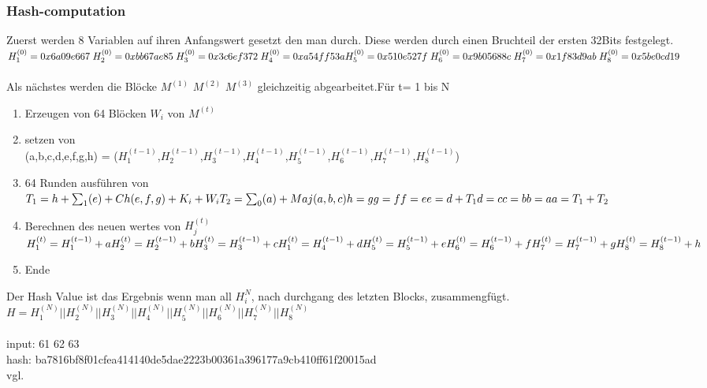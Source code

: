 {\subsubsection{Hash-computation}
\label{sec:hash-computation}
Zuerst werden 8 Variablen auf ihren Anfangswert gesetzt den man durch. Diese werden durch einen Bruchteil der ersten 32Bits festgelegt.\\
$H_1^{(0)} = 0x6a09e667\;  H_2^{(0)} = 0xbb67ae85\;   H_3^{(0)} = 0x3c6ef372 \;  H_4^{(0)} = 0xa54ff53a \\H_5^{(0)} = 0x510e527f\;  H_6^{(0)} = 0x9b05688c\;  H_7^{(0)} = 0x1f83d9ab\;H_8^{(0)} = 0x5be0cd19\;    $\\ \\
Als nächstes werden die Blöcke $M^{(1)}$ $M^{(2)}$ $M^{(3)}$ gleichzeitig abgearbeitet.Für t= 1 bis N
\begin{enumerate}
\item Erzeugen von 64 Blöcken $W_i$ von $M^{(t)}$
\item setzen von \\(a,b,c,d,e,f,g,h) = ($H_1^{(t-1)}$,$H_2^{(t-1)}$,$H_3^{(t-1)}$,$H_4^{(t-1)}$,$H_5^{(t-1)}$,$H_6^{(t-1)}$,$H_7^{(t-1)}$,$H_8^{(t-1)}$)
\item 64 Runden ausführen von\\$T_1 = h + {\sum_1} (e) + Ch(e, f, g) + K_i + W_i\\T_2 = \sum_0(a) + Maj(a,b,c)\\h = g\\g=f\\f=e\\e=d+ T_1\\d=c\\c=b\\b=a\\a=T_1+T_2$
\item Berechnen des neuen wertes von $H_j^{(t)}$\\$H_1^{(t)}  = H_1^{(t-1)} + a \\H_2^{(t)}  = H_2^{(t-1)} + b \\H_3^{(t)}  = H_3^{(t-1)} + c \\H_1^{(t)}  = H_4^{(t-1)} + d \\H_5^{(t)}  = H_5^{(t-1)} + e \\H_6^{(t)}  = H_6^{(t-1)} + f \\H_7^{(t)}  = H_7^{(t-1)} + g \\H_8^{(t)}  = H_8^{(t-1)} + h$
\item Ende
\end{enumerate}
Der Hash Value ist das Ergebnis wenn man all $H_i^N$, nach durchgang des letzten Blocks, zusammengfügt.\\$H = H_1^{(N)} || H_2^{(N)} || H_3^{(N)} || H_4^{(N)} || H_5^{(N)} || H_6^{(N)} || H_7^{(N)} || H_8^{(N)}$\\ \\
input: 61 62 63 \\
hash: ba7816bf8f01cfea414140de5dae2223b00361a396177a9cb410ff61f20015ad\\
vgl. \textcite{sha256}
}
